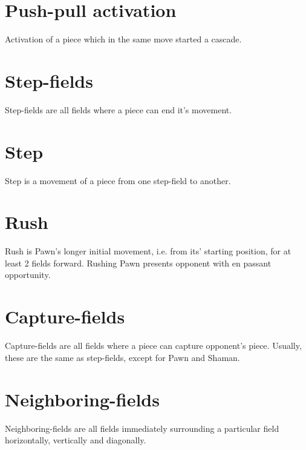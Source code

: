 \section*{Push-pull activation}
\label{sec:Terms/Push-pull activation}
Activation of a piece which in the same move started a cascade.

\section*{Step-fields}
\label{sec:Terms/Step-fields}
Step-fields are all fields where a piece can end it's movement.

\section*{Step}
\label{sec:Terms/Step}
Step is a movement of a piece from one step-field to another.

\section*{Rush}
\label{sec:Terms/Rush}
Rush is Pawn's longer initial movement, i.e. from its’ starting position, for at least 2 fields forward.
Rushing Pawn presents opponent with en passant opportunity.

\section*{Capture-fields}
\label{sec:Terms/Capture-fields}
Capture-fields are all fields where a piece can capture opponent's piece.
Usually, these are the same as step-fields, except for Pawn and Shaman.

\section*{Neighboring-fields}
\label{sec:Terms/Neighboring-fields}
Neighboring-fields are all fields immediately surrounding a particular field horizontally,
vertically and diagonally.


